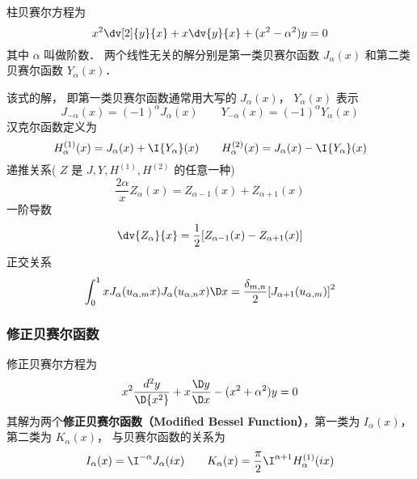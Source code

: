 
柱贝赛尔方程为
  \begin{equation}
{x^2}\dv[2]{y}{x} + x\dv{y}{x} + (x^2 - \alpha ^2)y = 0
\end{equation}
其中 $\alpha $ 叫做阶数． 两个线性无关的解分别是第一类贝赛尔函数 ${J_\alpha }(x)$ 和第二类贝赛尔函数 ${Y_\alpha }(x)$． 

该式的解， 即第一类贝赛尔函数通常用大写的 ${J_\alpha }(x)$，  ${Y_\alpha }(x)$ 表示
 \begin{equation}
 {J_{ - \alpha }}(x) = {( - 1)^\alpha }{J_\alpha }(x)
 \qquad
 {Y_{ - \alpha }}(x) = {( - 1)^\alpha }{Y_\alpha }(x)
\end{equation}
汉克尔函数定义为
 \begin{equation}
 H_\alpha ^{(1)}(x) = {J_\alpha }(x) + \I{Y_\alpha }(x)
 \qquad
 H_\alpha ^{(2)}(x) = {J_\alpha }(x) - \I{Y_\alpha }(x)
\end{equation} 
递推关系( $Z$ 是 $J,Y,{H^{(1)}},{H^{(2)}}$ 的任意一种)
 \begin{equation}
\frac{{2\alpha }}{x}{Z_\alpha }(x) = {Z_{\alpha  - 1}}(x) + {Z_{\alpha  + 1}}(x)
\end{equation}
一阶导数
  \begin{equation}
\dv{Z_\alpha}{x} = \frac{1}{2}[{Z_{\alpha  - 1}}(x) - {Z_{\alpha {\rm{ + }}1}}(x)]
\end{equation}
正交关系
  \begin{equation}
\int_0^1 {x{J_\alpha }({u_{\alpha ,m}}x){J_\alpha }({u_{\alpha ,n}}x)\D x = \frac{{{\delta _{m,n}}}}{2}{{[{J_{\alpha  + 1}}({u_{\alpha ,m}})]}^2}} 
\end{equation}

\subsubsection{修正贝赛尔函数}
修正贝赛尔方程为
  \begin{equation}
{x^2}\frac{{{d^2}y}}{{\D {x^2}}} + x\frac{{\D y}}{{\D x}} - ({x^2} + {\alpha ^2})y = 0
\end{equation}
其解为两个\textbf{修正贝赛尔函数（Modified Bessel Function）}，第一类为 ${I_\alpha }(x)$，  第二类为 ${K_\alpha }(x)$，  与贝赛尔函数的关系为
 \begin{equation}
{I_\alpha }(x) = {\I^{ - \alpha }}{J_\alpha }(ix)
\qquad
{K_\alpha }(x) = \frac{\pi }{2}{\I^{\alpha  + 1}}H_\alpha ^{(1)}(ix)
\end{equation}

